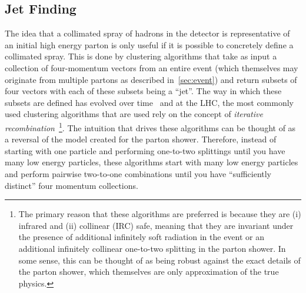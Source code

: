 \documentclass[UKenglish,texlive=2016]{\ATLASLATEXPATH atlasdoc}
\begin{document}
\subsection{Jet Finding}
The idea that a collimated spray of hadrons in the detector is representative of an initial high energy parton is only useful if it is possible to concretely define a collimated spray.  This is done by clustering algorithms that take as input a collection of four-momentum vectors from an entire event (which themselves may originate from multiple partons as described in~\ref{sec:event}) and return subsets of four vectors with each of these subsets being a ``jet''.  The way in which these subsets are defined has evolved over time~\cite{Ellis:2007ib} and at the LHC, the most commonly used clustering algorithms that are used rely on the concept of \textit{iterative recombination}~\cite{Cacciari:2008gp}\footnote{The primary reason that these algorithms are preferred is because they are (i) infrared and (ii) collinear (IRC) safe, meaning that they are invariant under the presence of additional infinitely soft radiation in the event or an additional infinitely collinear one-to-two splitting in the parton shower.  In some sense, this can be thought of as being robust against the exact details of the parton shower, which themselves are only approximation of the true physics.}.  The intuition that drives these algorithms can be thought of as a reversal of the model created for the parton shower.  Therefore, instead of starting with one particle and performing one-to-two splittings until you have many low energy particles, these algorithms start with many low energy particles and perform pairwise two-to-one combinations until you have ``sufficiently distinct'' four momentum collections.
\end{document}
